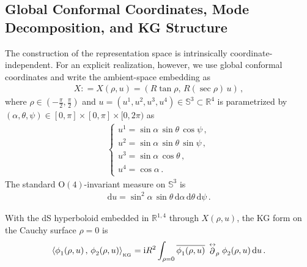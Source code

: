 \documentclass[aps,twocolumn,nofootinbib]{revtex4}
\begin{document}
\subsection{Global Conformal Coordinates, Mode Decomposition, and KG Structure} \label{Sec. ConformalCoor}

The construction of the representation space is intrinsically coordinate-independent. For an explicit realization, however, we use global conformal coordinates and write the ambient-space embedding as
\begin{align}\label{confo-coor}
    X: = X(\rho,u) = \left(R\tan \rho,\, R(\sec\rho) \,u\right) \,,
\end{align}
where $\rho\in\left(-\frac{\pi}{2},\frac{\pi}{2}\right)$ and $u=(u^1,u^2,u^3,u^4)\in{\mathbb{S}}^3\subset\mathbb R^4$ is parametrized by $(\alpha,\theta,\psi)\in[0,\pi]\times[0,\pi]\times[0,2\pi)$ as
\begin{align} \label{kha48}
    \begin{cases}
        u_{}^1 = \sin \alpha\, \sin \theta\, \cos \psi\,,\\
        u_{}^2 = \sin \alpha\, \sin \theta\, \sin \psi\,,\\
        u_{}^3 = \sin \alpha\, \cos \theta\,,\\
        u_{}^4 = \cos \alpha \,.
    \end{cases}
\end{align}
The standard $\mathrm{O}(4)$-invariant measure on $\mathbb{S}_{}^3$ is 
\begin{align}\label{measure}
    \mathrm{d}u = \sin_{}^2\alpha\,\sin\theta\, \mathrm{d}\alpha\, \mathrm{d}\theta\, \mathrm{d}\psi \,.
\end{align}

With the dS hyperboloid embedded in $\mathbb{R}^{1,4}$ through $X(\rho,u)$, the KG form on the Cauchy surface $\rho=0$ is
\begin{align} \label{KG.def}
    \left\langle \phi_1^{}(\rho,u) \,,\, \phi_2^{}(\rho,u) \right\rangle_{\vphantom{}_{\text{KG}}} = \mathrm{i} R^2 \int_{\rho=0} \overline{\phi_1^{}(\rho,u)} \,\stackrel{\leftrightarrow}{\partial}_{\rho}^{} \phi_2^{}(\rho,u)\, \mathrm{d}u \,.
\end{align}
\end{document}
